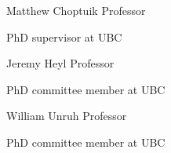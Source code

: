 
\begin{cventries}
    \cventrythree
    {Matthew Choptuik} %
    {Professor} %
    {} %
    {} %
    {
      \begin{cvitems} %
        \item PhD supervisor at UBC
      \end{cvitems}
    }
    
    \cventrythree
    {Jeremy Heyl} %
    {Professor} %
    {} %
    {} %
    {
      \begin{cvitems} %
        \item PhD committee member at UBC
      \end{cvitems}
    }
    
    \cventrythree
    {William Unruh} %
    {Professor} %
    {} %
    {} %
    {
      \begin{cvitems} %
        \item PhD committee member at UBC
      \end{cvitems}
    }

\end{cventries}
